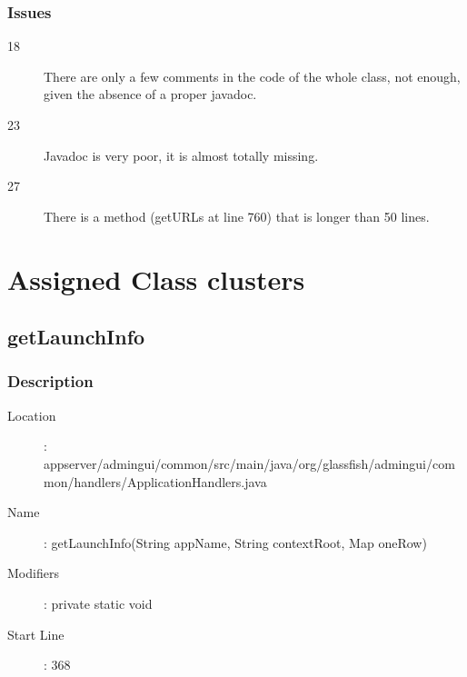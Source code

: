 		\subsubsection{Issues}
		\begin{description}
			\item[18] There are only a few comments in the code of the whole class, not enough,
			given the absence of a proper javadoc.
			\item[23] Javadoc is very poor, it is almost totally missing.
			\item[27] There is a method (getURLs at line 760) that is longer than 50 lines.
		\end{description}
\newpage
\section{Assigned Class clusters}
	\subsection{getLaunchInfo}
		\subsubsection{Description}
		\begin{description}
		\item[Location]: appserver/admingui/common/src/main/java/org/glassfish/admingui/common/handlers/ApplicationHandlers.java
		\item[Name]: getLaunchInfo(String appName, String contextRoot, Map oneRow)
		\item[Modifiers]: private static void
		\item[Start Line]: 368
		\end{description}
